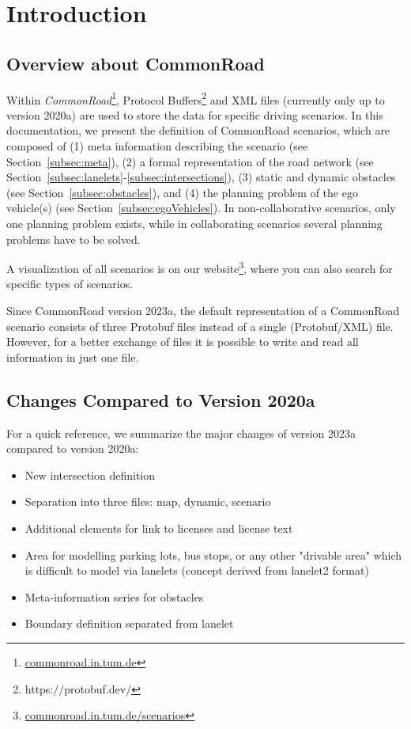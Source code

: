 \section{Introduction}
\label{sec:introduction}
\subsection{Overview about CommonRoad}
Within \textit{CommonRoad}\cite{Althoff2017a}\footnote{\href{https://commonroad.in.tum.de}{commonroad.in.tum.de}}, Protocol Buffers\footnote{https://protobuf.dev/} and XML files (currently only up to version 2020a) are used to store the data for specific driving scenarios. 
In this documentation, we present the definition of CommonRoad scenarios, which are composed of (1) meta information describing the scenario (see Section~\ref{subsec:meta}), (2) a formal representation of the road network (see Section~\ref{subsec:lanelets}-\ref{subsec:intersections}), (3) static and dynamic obstacles (see Section~\ref{subsec:obstacles}), and (4) the planning problem of the ego vehicle(s) (see Section~\ref{subsec:egoVehicles}). 
In non-collaborative scenarios, only one planning problem exists, while in collaborating scenarios several planning problems have to be solved.

A visualization of all scenarios is on our website\footnote{\href{https://commonroad.in.tum.de/scenarios/}{commonroad.in.tum.de/scenarios}}, where you can also search for specific types of scenarios.

Since CommonRoad version 2023a, the default representation of a CommonRoad scenario consists of three Protobuf files instead of a  single (Protobuf/XML) file.
However, for a better exchange of files it is possible to write and read all information in just one file.


\subsection{Changes Compared to Version 2020a}

For a quick reference, we summarize the major changes of version 2023a compared to version 2020a:
\begin{itemize}
\item New intersection definition
\item Separation into three files: map, dynamic, scenario 
\item Additional elements for link to licenses and license text
\item Area for modelling parking lots, bus stops, or any other "drivable area" which is difficult to model via lanelets (concept derived from lanelet2 format)
\item Meta-information series for obstacles
\item Boundary definition separated from lanelet 
\end{itemize}

